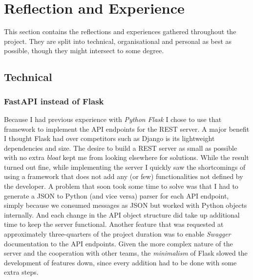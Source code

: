 \section{Reflection and Experience}
\label{sec:reflection}

    This section contains the reflections and experiences gathered throughout the project.
    They are split into technical, organisational and personal as best as possible, though they might intersect to some degree.

    \subsection{Technical}
    
        \subsubsection{FastAPI instead of Flask}
        \label{par:fast-api-instead-of-flask-nih}

            Because I had previous experience with \emph{Python Flask} I chose to use that framework to implement the API endpoints for the REST server.
            A major benefit I thought Flask had over competitors such as Django is its lightweight dependencies and size. 
            The desire to build a REST server as small as possible with no extra \emph{bloat} kept me from looking elsewhere for solutions.
            While the result turned out fine, while implementing the server I quickly saw the shortcomings of using a framework that does not add any (or few) functionalities not defined by the developer.
            A problem that soon took some time to solve was that I had to generate a JSON to Python (and vice versa) parser for each API endpoint, simply because we consumed messages as JSON but worked with Python objects internally. And each change in the API object structure did take up additional time to keep the server functional.
            Another feature that was requested at approximately three-quarters of the project duration was to enable \emph{Swagger} \cite{swaggerAPIDocumentationDesign} documentation to the API endpoints.
            Given the more complex nature of the server and the cooperation with other teams, the \emph{minimalism} of Flask slowed the development of features down, since every addition had to be done with some extra steps.


